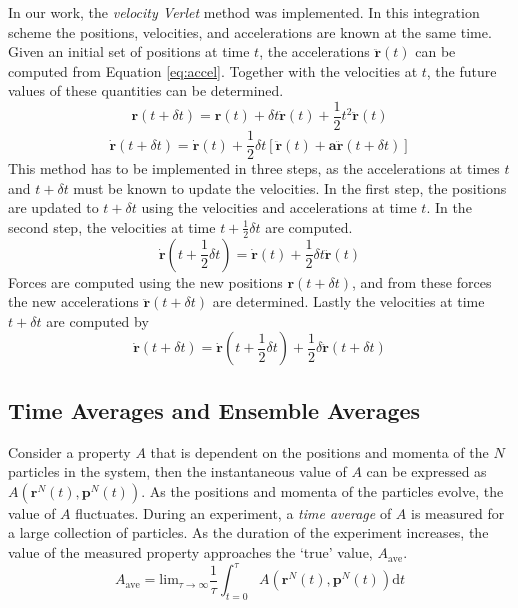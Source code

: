In our work, the \textit{velocity Verlet} method was implemented. In
this integration scheme the positions, velocities, and accelerations
are known at the same time. Given an initial set of positions at time
$t$, the accelerations $\mathbf{\ddot{r}}(t)$ can be computed from Equation
\eqref{eq:accel}. Together with the velocities at $t$, the future
values of these quantities can be determined.
\begin{equation}\label{eq:vv-r}
\mathbf{r}(t+\delta t) = \mathbf{r}(t) + \delta t \mathbf{\dot{r}}(t) +
\frac{1}{2}t^2\mathbf{\ddot{r}}(t)
\end{equation}
\begin{equation}\label{eq:vv-v}
\mathbf{\dot{r}}(t+ \delta t) = \mathbf{\dot{r}}(t) + \frac{1}{2}\delta
t[\mathbf{\ddot{r}}(t) + \mathbf{a\ddot{r}}(t + \delta t)]
\end{equation}
This method has to be implemented in three steps, as the accelerations
at times $t$ and $t + \delta t$ must be known to update the
velocities. In the first step, the positions are updated to
$t + \delta t$ using the velocities and accelerations at time $t$. In
the second step, the velocities at time $t + \frac{1}{2} \delta t$ are
computed.
\begin{equation}\label{eq:vv-v2}
\mathbf{\dot{r}}(t+\frac{1}{2}\delta t) = \mathbf{\dot{r}}(t) + \frac{1}{2}\delta t
\mathbf{\ddot{r}}(t)
\end{equation}
Forces are computed using the new positions $\mathbf{r}(t + \delta
t)$, and from these forces the new accelerations $\mathbf{\ddot{r}}(t +
\delta t)$ are determined. Lastly the velocities at time $t + \delta
t$ are computed by
\begin{equation}\label{eq:vv-v3}
\mathbf{\dot{r}}(t+\delta t) = \mathbf{\dot{r}}(t+\frac{1}{2}\delta t) +
\frac{1}{2}\delta \mathbf{\ddot{r}}(t + \delta t)
\end{equation}


\subsection{Time Averages and Ensemble Averages}
Consider a property $A$ that is dependent on the positions and momenta
of the $N$ particles in the system, then the instantaneous value of
$A$ can be expressed as $A(\mathbf{r}^N(t),\mathbf{p}^N(t))$. As the
positions and momenta of the particles evolve, the value of $A$
fluctuates. During an experiment, a \textit{time average} of $A$ is
measured for a large collection of particles. As the duration of the
experiment increases, the value of the measured property approaches
the `true' value, $A_{\mathrm{ave}}$.
\begin{equation}\label{eq:A-ave}
A_{\mathrm{ave}} = \mathrm{lim}_{\tau \to \infty} \frac{1}{\tau} \int_{t=0}^{\tau}
A(\mathbf{r}^N(t),\mathbf{p}^N(t))\mathrm{d}t
\end{equation}

